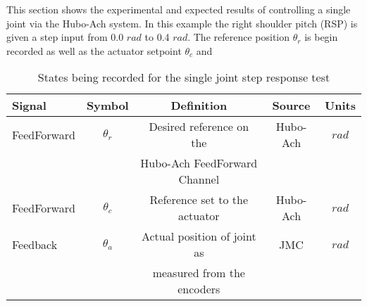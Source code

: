 This section shows the experimental and expected results of controlling a single joint via the Hubo-Ach system.
In this example the right shoulder pitch (RSP) is given a step input from 0.0 $rad$ to 0.4 $rad$.
The reference position $\theta_r$ is begin recorded as well as the actuator setpoint $\theta_c$ and 

\begin{table}\label{table:recorded}
\centering
\caption{States being recorded for the single joint step response test}
\begin{tabular}{l || c | c | c | c}
Signal      & Symbol     & Definition                    & Source      & Units \\
\hline
\hline
FeedForward & $\theta_r$ & Desired reference on the      & Hubo-Ach   & $rad$ \\
            &            & Hubo-Ach FeedForward Channel  &            &       \\
\hline
FeedForward & $\theta_c$ & Reference set to the actuator & Hubo-Ach   & $rad$ \\
\hline
Feedback    & $\theta_a$ & Actual position of joint as   & JMC        & $rad$ \\
            &            & measured from the encoders    &            &       \\
\hline
\end{tabular}
\end{table}

